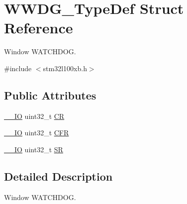 \hypertarget{struct_w_w_d_g___type_def}{\section{W\-W\-D\-G\-\_\-\-Type\-Def Struct Reference}
\label{struct_w_w_d_g___type_def}
}


Window W\-A\-T\-C\-H\-D\-O\-G.  




{\ttfamily \#include $<$stm32l100xb.\-h$>$}

\subsection*{Public Attributes}
\begin{DoxyCompactItemize}
\item 
\hyperlink{core__sc300_8h_aec43007d9998a0a0e01faede4133d6be}{\-\_\-\-\_\-\-I\-O} uint32\-\_\-t \hyperlink{struct_w_w_d_g___type_def_a4caf530d45f7428c9700d9c0057135f8}{C\-R}
\item 
\hyperlink{core__sc300_8h_aec43007d9998a0a0e01faede4133d6be}{\-\_\-\-\_\-\-I\-O} uint32\-\_\-t \hyperlink{struct_w_w_d_g___type_def_adcd6a7e5d75022e46ce60291f4b8544c}{C\-F\-R}
\item 
\hyperlink{core__sc300_8h_aec43007d9998a0a0e01faede4133d6be}{\-\_\-\-\_\-\-I\-O} uint32\-\_\-t \hyperlink{struct_w_w_d_g___type_def_a15655cda4854cc794db1f27b3c0bba38}{S\-R}
\end{DoxyCompactItemize}


\subsection{Detailed Description}
Window W\-A\-T\-C\-H\-D\-O\-G. 

